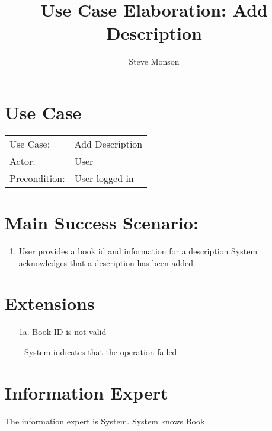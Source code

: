 \documentclass{article}
\title{Use Case Elaboration: Add Description}
\author{ Steve Monson }
\begin{document}
\maketitle


\section*{Use Case}
\begin{tabular}{l l}
Use Case:     & Add Description\\
Actor:        & User\\
Precondition: & User logged in\\
\end{tabular}


\section*{Main Success Scenario:}

\begin{enumerate}
    \item User provides a book id and information for a description
    \itme System acknowledges that a description has been added

\end{enumerate}

\section*{Extensions}

\begin{itemize}
    \item [1a.] Book ID is not valid
    
         - System indicates that the operation failed.
                            
\end{itemize}


\section*{Information Expert}
The information expert is System. System knows Book
\end{document}
